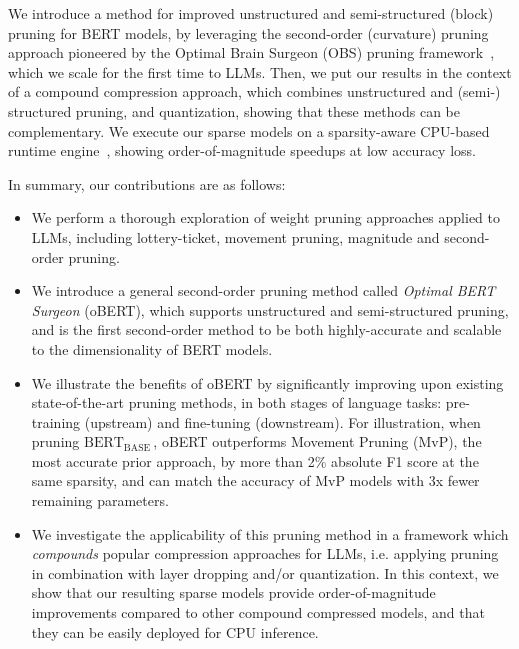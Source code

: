 \documentclass[11pt]{article}
\newcommand{\bert}{$\textrm{BERT}_{\textrm{BASE}}\,$}
\begin{document}
We introduce a method for improved unstructured and semi-structured (block) pruning for BERT models, by leveraging the second-order (curvature) pruning approach pioneered by the Optimal Brain Surgeon (OBS) pruning framework~\cite{LeCun1989OptimalBD, hassibi1993second}, which we scale for the first time to LLMs. Then, we put our results in the context of a compound compression approach, which combines unstructured and (semi-) structured pruning, and quantization, showing that these methods can be complementary. We execute our sparse models on a sparsity-aware CPU-based runtime engine~\cite{deepsparse}, showing order-of-magnitude speedups at low accuracy loss. 

\noindent In summary, our contributions are as follows:
\begin{itemize}[noitemsep]
\setlength{\itemindent}{0.5em}
    \item We perform a thorough exploration of weight pruning approaches applied to LLMs, including lottery-ticket, movement pruning, magnitude and second-order pruning. 
    
    \item We introduce a general second-order pruning method called \emph{Optimal BERT Surgeon} (oBERT), which supports unstructured and semi-structured pruning, and is the first second-order method to be both highly-accurate and scalable to the dimensionality of BERT models. 
    
    \item We illustrate the benefits of oBERT by significantly improving upon existing state-of-the-art pruning methods, in both stages of language tasks: pre-training (upstream) and fine-tuning (downstream). For illustration, when pruning \bert, oBERT outperforms Movement Pruning (MvP), the most accurate prior approach, by more than 2\% absolute F1 score at the same sparsity, and can match the accuracy of MvP models with 3x fewer remaining parameters. 
    
    \item We investigate the applicability of this pruning method in a framework which \emph{compounds} popular compression approaches for LLMs, i.e. applying pruning in combination with layer dropping and/or quantization. In this context, we show that our resulting sparse models provide order-of-magnitude improvements compared to other compound compressed models, and that they can be easily deployed for CPU inference.
\end{itemize}
 
\end{document}
